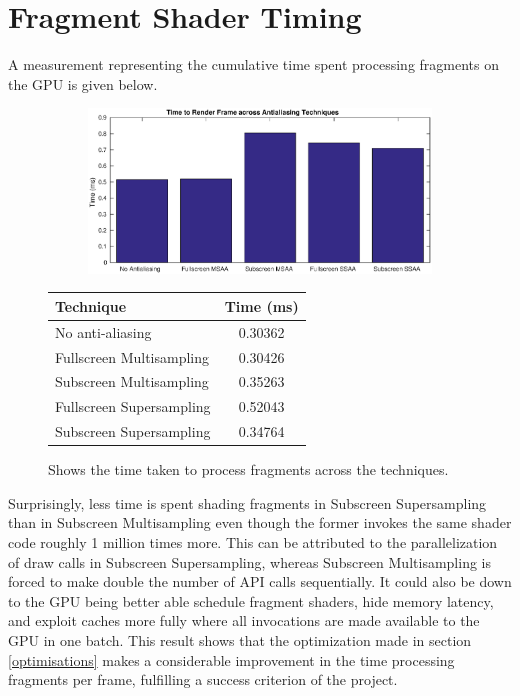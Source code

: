 \documentclass[12pt,a4paper,twoside,openright]{report}
\begin{document}
\section{Fragment Shader Timing}

A measurement representing the cumulative time spent processing fragments on the GPU is given below.

\begin{figure}[tbh]

 
\begin{subfigure}{0.5\textwidth}
\includegraphics[width=1.2\linewidth]{figs/timeToRenderFrame.eps}
\end{subfigure}
\qquad
\begin{tabular}{l|c}
Technique   & Time (ms) \\ 
\hline
No anti-aliasing      & 0.30362 \\
Fullscreen Multisampling     & 0.30426 \\
Subscreen Multisampling    &  0.35263  \\
Fullscreen Supersampling      &  0.52043   \\
Subscreen Supersampling    &  0.34764  \\
\end{tabular}
 
\caption{Shows the time taken to process fragments across the techniques.}
\end{figure}

\noindent Surprisingly, less time is spent shading fragments in Subscreen Supersampling than in Subscreen Multisampling even though the former invokes the same shader code roughly 1 million times more. This can be attributed to the parallelization of draw calls in Subscreen Supersampling, whereas Subscreen Multisampling is forced to make double the number of API calls sequentially. It could also be down to the GPU being better able schedule fragment shaders, hide memory latency, and exploit caches more fully where all invocations are made available to the GPU in one batch. This result shows that the optimization made in section \ref{optimisations} makes a considerable improvement in the time processing fragments per frame, fulfilling a success criterion of the project. \\
\end{document}
